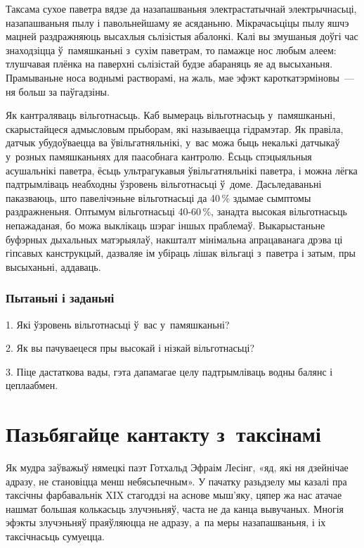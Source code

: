 Таксама сухое паветра вядзе да назапашваньня электрастатычнай электрычнасьці, назапашваньня пылу і павольнейшаму яе асяданьню. Мікрачасьціцы пылу яшчэ мацней раздражняюць высахлыя сьлізістыя абалонкі. Калі вы змушаныя доўгі час знаходзіцца ў~памяшканьні з~сухім паветрам, то памажце нос любым алеем: тлушчавая плёнка на паверхні сьлізістай будзе абараняць яе ад высыханьня. Прамываньне носа воднымі растворамі, на жаль, мае эфэкт кароткатэрміновы~--- ня больш за паўгадзіны.




Як кантраляваць вільготнасьць. Каб вымераць вільготнасьць у~памяшканьні, скарыстайцеся адмысловым прыборам, які называецца гідрамэтар. Як правіла, датчык убудоўваецца ва ўвільгатняльнікі, у~вас можа быць некалькі датчыкаў у~розных памяшканьнях для паасобнага кантролю. Ёсьць спэцыяльныя асушальнікі паветра, ёсьць ультрагукавыя ўвільгатняльнікі паветра, і можна лёгка падтрымліваць неабходны ўзровень вільготнасьці ў~доме. Дасьледаваньні паказваюць, што павелічэньне вільготнасьці да 40\,\% здымае сымптомы раздражненьня. Оптымум вільготнасьці 40-60\,\%, занадта высокая вільготнасьць непажаданая, бо можа выклікаць шэраг іншых праблемаў. Выкарыстаньне буфэрных дыхальных матэрыялаў, накшталт мінімальна апрацаванага дрэва ці гіпсавых канструкцый, дазваляе ім убіраць лішак вільгаці з~паветра і затым, пры высыханьні, аддаваць.

\subsubsection{Пытаньні і заданьні}

1. Які ўзровень вільготнасьці ў~вас у~памяшканьні?

2. Як вы пачуваецеся пры высокай і нізкай вільготнасьці?

3. Піце дастаткова вады, гэта дапамагае целу падтрымліваць водны балянс і цеплаабмен.


\section{Пазьбягайце кантакту з~таксінамі}

Як мудра заўважыў нямецкі паэт Готхальд Эфраім Лесінг, «яд, які ня дзейнічае адразу, не становіцца менш небясьпечным». У пачатку разьдзелу мы казалі пра таксічны фарбавальнік XIX стагоддзі на аснове мыш'яку, цяпер жа нас атачае нашмат большая колькасьць злучэньняў, часта не да канца вывучаных. Многія эфэкты злучэньняў праяўляюцца не адразу, а~па меры назапашваньня, і іх таксічнасьць сумуецца.

